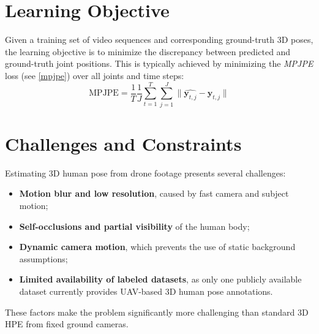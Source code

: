 \section{Learning Objective}
Given a training set of video sequences and corresponding ground-truth 3D poses, the learning objective is to minimize the discrepancy between predicted and ground-truth joint positions.
This is typically achieved by minimizing the \textit{MPJPE} loss (see \ref{mpjpe}) over all joints and time steps:
\begin{equation}
    \text{MPJPE} = \frac{1}{T} \frac{1}{J} \sum_{t=1}^{T} \sum_{j=1}^{J} \| \hat{\mathbf{y}_{t,j}} - \mathbf{y}_{t,j} \|
\end{equation}


\section{Challenges and Constraints}
Estimating 3D human pose from drone footage presents several challenges:
\begin{itemize}
    \item \textbf{Motion blur and low resolution}, caused by fast camera and subject motion;
    \item \textbf{Self-occlusions and partial visibility} of the human body;
    \item \textbf{Dynamic camera motion}, which prevents the use of static background assumptions;
    \item \textbf{Limited availability of labeled datasets}, as only one publicly available dataset currently provides UAV-based 3D human pose annotations.
\end{itemize}
These factors make the problem significantly more challenging than standard 3D HPE from fixed ground cameras.

